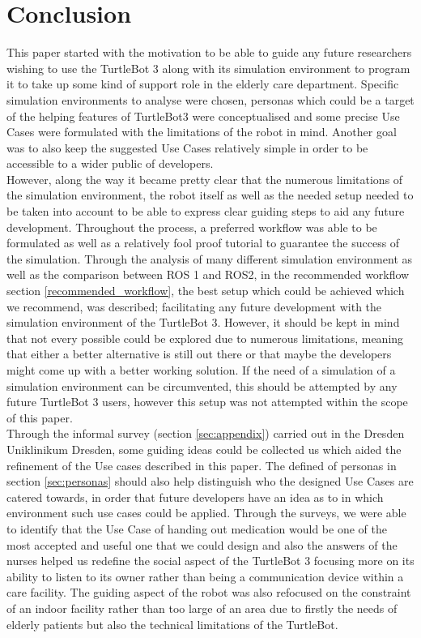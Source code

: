 \documentclass[plainarticle,zihtitle,english,final,hyperref,utf8]{zihpub}
\begin{document}
\section{Conclusion}
 This paper started with the motivation to be able to guide any future researchers wishing to use the TurtleBot 3 along with its simulation environment to program it to take up some kind of support role in the elderly care department. Specific simulation environments to analyse were chosen, personas which could be a target of the helping features of TurtleBot3 were conceptualised and some precise Use Cases were formulated with the limitations of the robot in mind. Another goal was to also keep the suggested Use Cases relatively simple in order to be accessible to a wider public of developers.\\
 \newline
 However, along the way it became pretty clear that the numerous limitations of the simulation environment, the robot itself as well as the needed setup needed to be taken into account to be able to express clear guiding steps to aid any future development. Throughout the process, a preferred workflow was able to be formulated as well as a relatively fool proof tutorial to guarantee the success of the simulation. Through the analysis of many different simulation environment as well as the comparison between ROS 1 and ROS2, in the recommended workflow section \ref{recommended_workflow}, the best setup which could be achieved which we recommend, was described; facilitating any future development with the simulation environment of the TurtleBot 3. However, it should be kept in mind that not every possible could be explored due to numerous limitations, meaning that either a better alternative is still out there or that maybe the developers might come up with a better working solution. If the need of a simulation of a simulation environment can be circumvented, this should be attempted by any future TurtleBot 3 users, however this setup was not attempted within the scope of this paper.\\
 \newline
 Through the informal survey (section \ref{sec:appendix}) carried out in the Dresden Uniklinikum Dresden, some guiding ideas could be collected us which aided the refinement of the Use cases described in this paper. The defined of personas in section \ref{sec:personas} should also help distinguish who the designed Use Cases are catered towards, in order that future developers have an idea as to in which environment such use cases could be applied. Through the surveys, we were able to identify that the Use Case of handing out medication would be one of the most accepted and useful one that we could design and also the answers of the nurses helped us redefine the social aspect of the TurtleBot 3 focusing more on its ability to listen to its owner rather than being a communication device within a care facility. The guiding aspect of the robot was also refocused on the constraint of an indoor facility rather than too large of an area due to firstly the needs of elderly patients but also the technical limitations of the TurtleBot. \\
\end{document}
